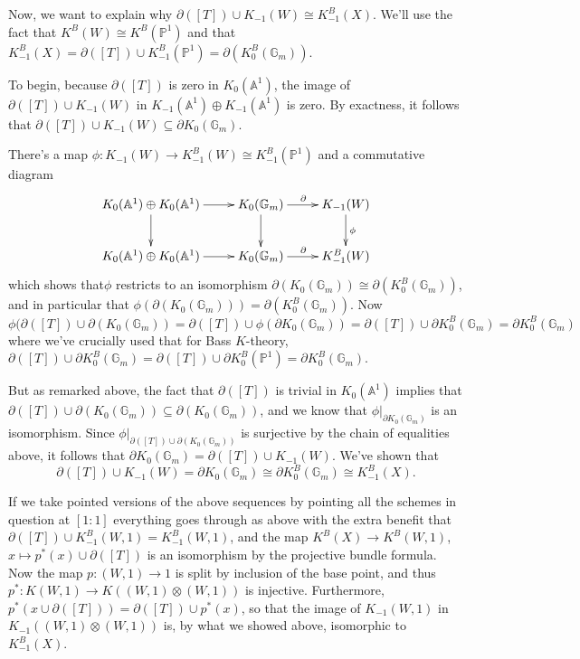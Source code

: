 \documentclass[edeposit,fullpage]{uiucthesis2009}
\newcommand{\mbb}{\mathbb}
\theoremstyle{plain}
\numberwithin{lemma}{section}
\theoremstyle{definition}
\begin{document}
Now,
we want to explain why $\partial([T]) \cup K_{-1}(W) \cong
K^B_{-1}(X)$. We'll use the fact that $K^B(W) \cong K^B(\mbb P^1)$ and that
$K^B_{-1}(X) = \partial([T]) \cup K^B_{-1}(\mbb P^1)
= \partial(K^B_0(\mbb G_m))$. 

To begin, because $\partial([T])$ is zero in
$K_0(\mbb A^1)$, the image of $\partial([T]) \cup K_{-1}(W)$ in
$K_{-1}(\mbb A^1) \oplus K_{-1}(\mbb A^1)$ is zero. By exactness, it follows that
$\partial([T]) \cup K_{-1}(W)  \subseteq  \partial K_0(\mbb G_m)$. 

There's a map $\phi : K_{-1}(W) \rightarrow K_{-1}^B(W) \cong
K_{-1}^B(\mbb P^1)$ and a commutative diagram
\[
\xymatrix{K_0(\mbb A^1) \oplus K_0(\mbb A^1) \ar[r] \ar[d] & K_0(\mbb
  G_m) \ar[r]^\partial \ar[d] & K_{-1}(W) \ar[d]^\phi\\
K_0(\mbb A^1) \oplus K_0(\mbb A^1) \ar[r] & K_0(\mbb
  G_m) \ar[r]^\partial & K_{-1}^B(W)
}
\]
which shows that$\phi$ restricts to an isomorphism $\partial(K_0(\mbb
  G_m)) \cong \partial(K_0^B(\mbb
  G_m))$, and in particular that $\phi(\partial(K_0(\mbb
  G_m)) ) = \partial(K_0^B(\mbb
  G_m))$. Now 
\[
\phi(\partial([T]) \cup \partial(K_{0}(\mbb G_m)) = \partial([T]) \cup
  \phi(\partial K_{0}(\mbb G_m)) = \partial([T]) \cup \partial
  K_{0}^B(\mbb G_m) = \partial K_0^B(\mbb G_m)
\]
where we've crucially used that for Bass $K$-theory, $\partial([T])
\cup \partial K_0^B(\mbb G_m) = \partial([T])
\cup \partial K_0^B(\mbb P^1) = \partial K_0^B(\mbb G_m)$. 

But as remarked above, the fact that $\partial([T])$ is trivial in
$K_0(\mbb A^1)$ implies that $\partial([T]) \cup \partial(K_{0}(\mbb G_m))
\subseteq \partial(K_{0}(\mbb G_m))$, and we know that
$\phi|_{\partial K_0(\mbb G_m)}$ is an isomorphism. Since
$\phi|_{\partial([T]) \cup \partial(K_{0}(\mbb G_m))}$ is surjective
by the chain of equalities above,
it follows that $\partial
K_0(\mbb G_m) =\partial([T]) \cup K_{-1}(W)$. We've shown that
\[
\partial([T]) \cup K_{-1}(W) = \partial K_0(\mbb G_m) \cong \partial
K_0^B(\mbb G_m) \cong K_{-1}^B(X).
\]

If we take pointed versions of the above sequences by pointing all the
schemes in question at $[1:1]$ everything goes through as above with
the extra benefit that $\partial([T]) \cup K^B_{-1}(W,1) =
K^B_{-1}(W,1)$, and the map $K^B(X) \rightarrow K^B(W,1)$, $x \mapsto
p^*(x) \cup \partial([T])$ is an isomorphism by the projective bundle
formula. Now the map $p : (W,1) \rightarrow 1$ is split by inclusion
of the base point, and thus $p^* : K(W,1) \rightarrow K((W,1) \otimes
(W,1))$ is injective. Furthermore, $p^*(x \cup \partial([T]))
= \partial([T]) \cup p^*(x)$, so that the image of $K_{-1}(W,1)$ in
$K_{-1}((W,1) \otimes (W,1))$ is, by what we showed above, isomorphic
to $K^B_{-1}(X)$. 
\end{document}
